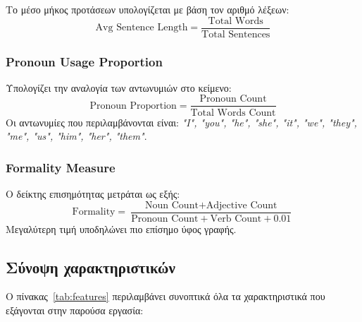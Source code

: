 Το μέσο μήκος προτάσεων υπολογίζεται με βάση τον αριθμό λέξεων:
\[
\text{Avg Sentence Length} = \frac{\text{Total Words}}{\text{Total Sentences}}
\]

\subsubsection{Pronoun Usage Proportion}

Υπολογίζει την αναλογία των αντωνυμιών στο κείμενο:
\[
\text{Pronoun Proportion} = \frac{\text{Pronoun Count}}{\text{Total Words Count}}
\]
Οι αντωνυμίες που περιλαμβάνονται είναι: \textit{"I", "you", "he", "she", "it", "we", "they", "me", "us", "him", "her", "them"}.

\subsubsection{Formality Measure}

Ο δείκτης επισημότητας μετράται ως εξής:
\[
\text{Formality} = \frac{\text{Noun Count} + \text{Adjective Count}}{\text{Pronoun Count} + \text{Verb Count} + 0.01}
\]
Μεγαλύτερη τιμή υποδηλώνει πιο επίσημο ύφος γραφής.

\subsection{Σύνοψη χαρακτηριστικών}
Ο πίνακας~\autoref{tab:features} περιλαμβάνει συνοπτικά όλα τα χαρακτηριστικά που εξάγονται στην παρούσα εργασία:


